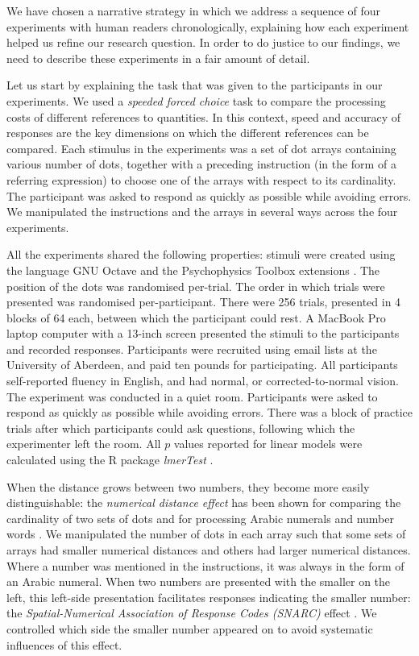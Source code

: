 \documentclass[ %
  graybox       %
 ,envcountchap  %
 ,sectrefs      %
]{svmono}
\begin{document}
We have chosen a narrative strategy in which we address a sequence of four experiments with human readers chronologically, explaining how each experiment helped us refine our research question. In order to do justice to our findings, we need to describe these experiments in a fair amount of detail.

Let us start by explaining the task that was given to the participants in our experiments. We used a {\em speeded forced choice} task to compare the processing costs of different references to quantities. In this context, speed and accuracy of responses are the key dimensions on which the different references can be compared. Each stimulus in the experiments was a set of dot arrays containing various number of dots, together with a preceding instruction (in the form of a referring expression) to choose one of the arrays with respect to its cardinality. The participant was asked to respond as quickly as possible while avoiding errors. We manipulated the instructions and the arrays in several ways across the four experiments.

All the experiments shared the following properties: stimuli were created using the language GNU Octave \citep{eaton:2002} and the Psychophysics Toolbox extensions \citep{ptbx1, ptbx2}. The position of the dots was randomised per-trial. The order in which trials were presented was randomised per-participant. There were 256 trials, presented in 4 blocks of 64 each, between which the participant could rest. A MacBook Pro laptop computer with a 13-inch screen presented the stimuli to the participants and recorded responses. Participants were recruited using email lists at the University of Aberdeen, and paid ten pounds for participating. All participants self-reported fluency in English, and had normal, or corrected-to-normal vision. The experiment was conducted in a quiet room. Participants were asked to respond as quickly as possible while avoiding errors. There was a block of practice trials after which participants could ask questions, following which the experimenter left the room. All $p$ values reported for linear models were calculated using the R package \emph{lmerTest} \citep{lmerTest}.

When the distance grows between two numbers, they become more easily distinguishable: the \emph{numerical distance effect} has been shown for comparing the cardinality of two sets of dots \citep{van123} and for processing Arabic numerals and number words \citep{Dehaene1996}. We manipulated the number of dots in each array such that some sets of arrays had smaller numerical distances and others had larger numerical distances. Where a number was mentioned in the instructions, it was always in the form of an Arabic numeral. When two numbers are presented with the smaller on the left, this left-side presentation facilitates responses indicating the smaller number: the \emph{Spatial-Numerical Association of Response Codes (SNARC)} effect \citep{dehaene1993mental, gevers2006automatic}. We controlled which side the smaller number appeared on to avoid systematic influences of this effect.
\end{document}
